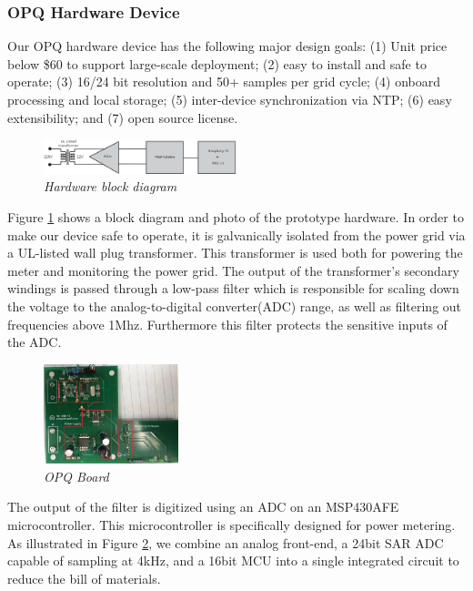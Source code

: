 \subsubsection{OPQ Hardware Device}

Our OPQ hardware device has the following major design goals: (1) Unit price below \$60 to support large-scale deployment; (2) easy to install and safe to operate; (3) 16/24 bit resolution and 50+ samples per grid cycle; (4) onboard processing and local storage; (5) inter-device synchronization via NTP; (6) easy extensibility; and (7) open source license. 

\begin{figure}
  \includegraphics[width=0.5\textwidth]{figures/hardware-block-diagram.eps}
  \caption{\em \small Hardware block diagram}
  \label{fig:hardware-block-diagram}
\end{figure} 


Figure \ref{fig:hardware-block-diagram} shows a block diagram and photo of the prototype hardware. In order to make our device safe to operate, it is galvanically isolated from the power grid via a UL-listed wall plug transformer. This transformer is used both for powering the meter and monitoring the power grid. The output of the transformer's secondary windings is passed through a low-pass filter which is responsible for scaling down the voltage to the analog-to-digital converter(ADC) range, as well as filtering out frequencies above 1Mhz. Furthermore this filter protects the sensitive inputs of the ADC.

\begin{figure}
  \includegraphics[width=0.35\textwidth]{figures/board3.eps}
  \caption{\em \small OPQ Board}
  \label{fig:board}
\end{figure} 

The output of the filter is digitized using an ADC on an MSP430AFE microcontroller. This microcontroller is specifically designed for power metering. As illustrated in Figure \ref{fig:board}, we combine an analog front-end, a 24bit SAR ADC capable of sampling at 4kHz, and a 16bit MCU into a single integrated circuit to reduce the bill of materials. 

